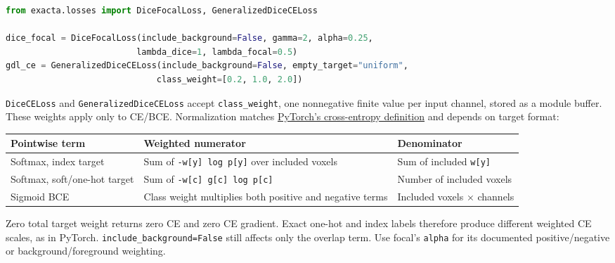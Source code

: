 \begin{lstlisting}[language=Python]
from exacta.losses import DiceFocalLoss, GeneralizedDiceCELoss

dice_focal = DiceFocalLoss(include_background=False, gamma=2, alpha=0.25,
                          lambda_dice=1, lambda_focal=0.5)
gdl_ce = GeneralizedDiceCELoss(include_background=False, empty_target="uniform",
                              class_weight=[0.2, 1.0, 2.0])
\end{lstlisting}

\texttt{DiceCELoss} and \texttt{GeneralizedDiceCELoss} accept \texttt{class\_weight}, one nonnegative finite value
per input channel, stored as a module buffer. These weights apply only to CE/BCE. Normalization
matches \href{https://docs.pytorch.org/docs/2.14/generated/torch.nn.CrossEntropyLoss.html}{PyTorch's cross-entropy definition}
and depends on target format:

{\small{} %
\begin{longtable}[]{@{}
  >{\raggedright\arraybackslash}p{}
  >{\raggedright\arraybackslash}p{}
  >{\raggedright\arraybackslash}p{}@{}}
\toprule\noalign{}
\begin{minipage}[b]{\linewidth}\raggedright
Pointwise term
\end{minipage} & \begin{minipage}[b]{\linewidth}\raggedright
Weighted numerator
\end{minipage} & \begin{minipage}[b]{\linewidth}\raggedright
Denominator
\end{minipage} \\
\midrule\noalign{}
\endhead
\bottomrule\noalign{}
\endlastfoot
Softmax, index target & Sum of \texttt{-w{[}y{]}\ log\ p{[}y{]}} over included voxels & Sum of included \texttt{w{[}y{]}} \\
Softmax, soft/one-hot target & Sum of \texttt{-w{[}c{]}\ g{[}c{]}\ log\ p{[}c{]}} & Number of included voxels \\
Sigmoid BCE & Class weight multiplies both positive and negative terms & Included voxels × channels \\
\end{longtable}
}

Zero total target weight returns zero CE and zero CE gradient. Exact one-hot and index labels
therefore produce different weighted CE scales, as in PyTorch. \texttt{include\_background=False}
still affects only the overlap term. Use focal's \texttt{alpha} for its documented positive/negative
or background/foreground weighting.

